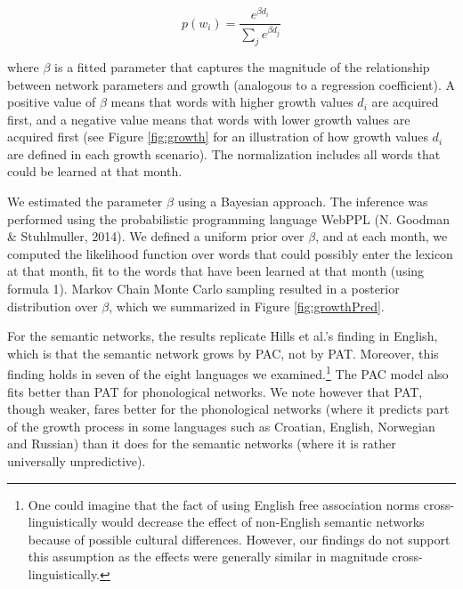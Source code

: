\documentclass[english,floatsintext,man]{apa6}
\theoremstyle{definition}
\theoremstyle{definition}
\theoremstyle{definition}
\theoremstyle{remark}
\begin{document}
\begin{equation}
 p(w_i)= \frac{e^{\beta d_i}}{\sum_j e^{\beta d_j} }
\end{equation}

\noindent where \(\beta\) is a fitted parameter that captures the
magnitude of the relationship between network parameters and growth
(analogous to a regression coefficient). A positive value of \(\beta\)
means that words with higher growth values \(d_i\) are acquired first,
and a negative value means that words with lower growth values are
acquired first (see Figure \ref{fig:growth} for an illustration of how
growth values \(d_i\) are defined in each growth scenario). The
normalization includes all words that could be learned at that month.

We estimated the parameter \(\beta\) using a Bayesian approach. The
inference was performed using the probabilistic programming language
WebPPL (N. Goodman \& Stuhlmuller, 2014). We defined a uniform prior
over \(\beta\), and at each month, we computed the likelihood function
over words that could possibly enter the lexicon at that month, fit to
the words that have been learned at that month (using formula 1). Markov
Chain Monte Carlo sampling resulted in a posterior distribution over
\(\beta\), which we summarized in Figure \ref{fig:growthPred}.

For the semantic networks, the results replicate Hills et al.'s finding
in English, which is that the semantic network grows by PAC, not by PAT.
Moreover, this finding holds in seven of the eight languages we
examined.\footnote{One could imagine that the fact of using English free association norms cross-linguistically would decrease the effect of non-English semantic networks because of possible cultural differences. However, our findings do not support this assumption as the effects were generally similar in magnitude cross-linguistically.}
The PAC model also fits better than PAT for phonological networks. We
note however that PAT, though weaker, fares better for the phonological
networks (where it predicts part of the growth process in some languages
such as Croatian, English, Norwegian and Russian) than it does for the
semantic networks (where it is rather universally unpredictive).
\end{document}
